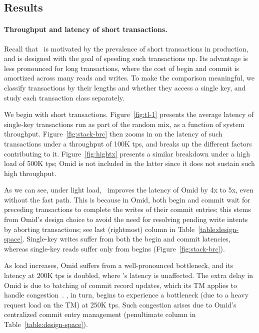 \subsection{Results}
\label{ssec:results}

\paragraph{Throughput and latency of short transactions.} 

Recall that \sys\ is motivated by the prevalence of short transactions in production, and is designed with
the goal of speeding such transactions up.
Its advantage is less pronounced for long transactions, where the cost of begin and commit is amortized
across many reads and writes.
To make the comparison meaningful, we classify transactions by their lengths and whether they
access a single key, and study each transaction class separately. 

We begin with short transactions. 
Figure~\ref{fig:tl-1} presents the average latency of single-key transactions run as part of the random mix,
as a function of {system} throughput.
Figure~\ref{fig:stack-brc}  then zooms in on the latency of such transactions under 
a throughput of 100K tps, and breaks up the different factors contributing to it. 
Figure~\ref{fig:hightx}  presents a similar breakdown under a high load of 500K tps; Omid 
is not included in the latter since it does not sustain such high throughput.

As we can see, under light load, \sys\ improves the latency of Omid by 4x to 5x, even without the fast path.
This is because in Omid, both begin and commit wait for preceding transactions to complete the writes of 
their commit entries; this stems from Omid's design choice to avoid the need for resolving pending write intents
by aborting transactions; see last (rightmost) column in Table~\ref{table:design-space}. 
Single-key writes suffer from both the begin and commit latencies, whereas single-key reads  
suffer only from begins (Figure~\ref{fig:stack-brc}). 

As load increases, Omid suffers from a well-pronounced bottleneck, and its latency at 200K tps is doubled, where \sys's 
latency is unaffected. The extra delay in Omid is due to batching of commit record updates, 
which its TM applies to handle congestion~\cite{Omid2017}. 
\sys, in turn, begins to experience a bottleneck (due to a heavy request load on the TM)  at 250K tps.
Such congestion arises due to Omid's centralized 
commit entry management (penultimate column in Table~\ref{table:design-space}).

